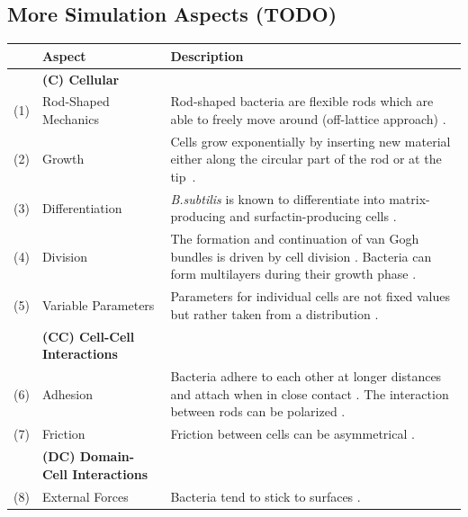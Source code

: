 \documentclass{article}
\begin{document}
\subsection{More Simulation Aspects (TODO)}
\label{section:supplement-more-simulation-aspects}
\begin{table}[H]
    \centering
    \def\arraystretch{1.3}
    \begin{tabularx}{\textwidth}{c l X}
        &\textbf{Aspect} & \textbf{Description}\\
        \toprule
        &\textbf{(C) Cellular}\\
        \midrule
        (1) & Rod-Shaped Mechanics &
            Rod-shaped bacteria are flexible rods which are able to freely move around (off-lattice
            approach) \cite{Takeuchi2005,Ursell2014,Amir2014_2}.\\
        (2) & Growth &
            Cells grow exponentially by inserting new material either along the circular part of the
            rod or at the tip~\cite{Robert2014,Takeuchi2005}.\\
        (3) & Differentiation &
            \textit{B.subtilis} is known to differentiate into matrix-producing and
            surfactin-producing cells \cite{vanGestel2015,Lpez2010}.\\
        (4) & Division &
            The formation and continuation of van Gogh bundles is driven by cell division
            \cite{vanGestel2015}.
            Bacteria can form multilayers during their growth phase \cite{Duvernoy2018}.\\
        (5) & Variable Parameters &
            Parameters for individual cells are not fixed values but rather taken from a
            distribution \cite{Koutsoumanis2013}.\\
        &\textbf{(CC) Cell-Cell Interactions}\\
        \midrule
        (6) & Adhesion &
            Bacteria adhere to each other at longer distances and attach when in close contact
            \cite{Verwey1947,Trejo2013}.
            The interaction between rods can be polarized \cite{Duvernoy2018}.\\
        (7) & Friction &
            Friction between cells \cite{Grant2014} can be asymmetrical \cite{Doumic2020}.\\
        &\textbf{(DC) Domain-Cell Interactions}\\
        \midrule
        (8) & External Forces &
            Bacteria tend to stick to surfaces \cite{vanLoosdrecht1989}.

\end{tabularx}
\end{table}
\end{document}
